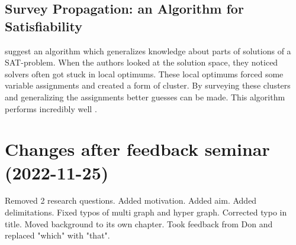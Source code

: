 \documentclass[msc,lith,english]{liuthesis}
\begin{document}
\section{Survey Propagation: an Algorithm for Satisfiability}
\citeauthor{sourceSurveyProp} suggest an algorithm which generalizes knowledge about parts of solutions of a SAT-problem. 
When the authors looked at the solution space, they noticed solvers often got stuck in local optimums.
These local optimums forced some variable assignments and created a form of cluster.
By surveying these clusters and generalizing the assignments better guesses can be made.
This algorithm performs incredibly well \cite{sourceSolutionSpace}. \cite{sourceSurveyProp}

\printbibliography

\appendix
\chapter{Changes after feedback seminar (2022-11-25)}
Removed 2 research questions. Added motivation. Added aim. Added delimitations. Fixed typos of multi graph and hyper graph. Corrected typo in title. Moved background to its own chapter. Took feedback from Don and replaced "which" with "that".
\end{document}
